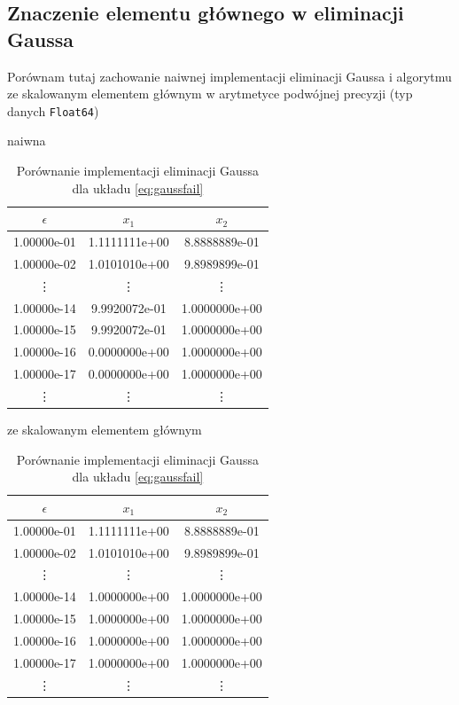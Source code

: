 \documentclass[11pt,wide]{mwart}
\begin{document}
\subsection{Znaczenie elementu głównego w eliminacji Gaussa}
Porównam tutaj zachowanie naiwnej implementacji eliminacji Gaussa i algorytmu ze skalowanym elementem głównym w arytmetyce podwójnej precyzji (typ danych \texttt{Float64})
\begin{center}
\begin{table}[!htb]
    \begin{subtable}{.5\linewidth}
      \centering
        \caption{naiwna}
\begin{tabular}{| c | c | c |} \hline
$ \epsilon $ & $x_1$ & $x_2$ \\ \hline
1.00000e-01 & 1.1111111e+00 & 8.8888889e-01 \\ 
1.00000e-02 & 1.0101010e+00 & 9.8989899e-01 \\
\vdots & \vdots & \vdots \\
1.00000e-14 & 9.9920072e-01 & 1.0000000e+00 \\ 
1.00000e-15 & 9.9920072e-01 & 1.0000000e+00 \\ 
1.00000e-16 & 0.0000000e+00 & 1.0000000e+00 \\ 
1.00000e-17 & 0.0000000e+00 & 1.0000000e+00 \\
\vdots & \vdots & \vdots \\ \hline
\end{tabular}
\end{subtable}%
\begin{subtable}{.5\linewidth}
\centering
\caption{ze skalowanym elementem głównym}
\begin{tabular}{| c | c | c |} \hline
$ \epsilon $ & $x_1$ & $x_2$ \\ \hline
1.00000e-01 & 1.1111111e+00 & 8.8888889e-01 \\ 
1.00000e-02 & 1.0101010e+00 & 9.8989899e-01 \\ 
\vdots & \vdots & \vdots \\
1.00000e-14 & 1.0000000e+00 & 1.0000000e+00 \\ 
1.00000e-15 & 1.0000000e+00 & 1.0000000e+00 \\ 
1.00000e-16 & 1.0000000e+00 & 1.0000000e+00 \\ 
1.00000e-17 & 1.0000000e+00 & 1.0000000e+00 \\
\vdots & \vdots & \vdots \\ \hline
\end{tabular}
\end{subtable}
\caption{Porównanie implementacji eliminacji Gaussa dla układu \eqref{eq:gaussfail}}
\end{table}
\end{center}
\end{document}
